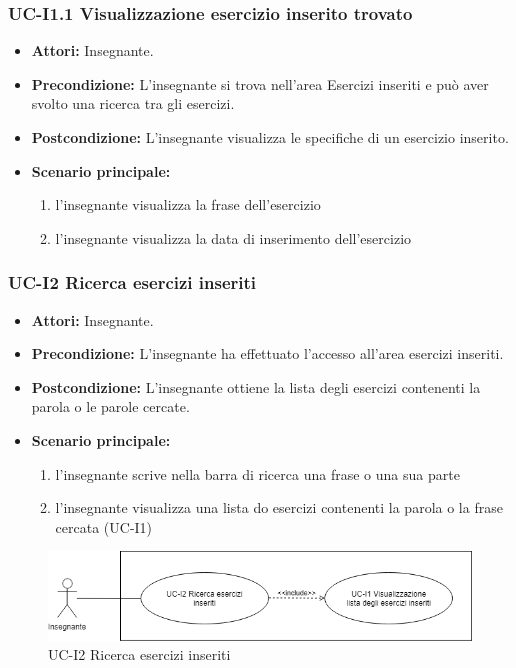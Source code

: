 \subsubsection{UC-I1.1 Visualizzazione esercizio inserito trovato}
\begin{itemize}
\item \textbf{Attori: }Insegnante.
		\item \textbf{Precondizione: }L'insegnante si trova nell'area Esercizi inseriti e può aver svolto una ricerca tra gli esercizi.
		\item \textbf{Postcondizione: }L'insegnante visualizza le specifiche di un esercizio inserito. 
		\item \textbf{Scenario principale:}
		\begin{enumerate}
			\item l'insegnante visualizza la frase dell'esercizio
			\item l'insegnante visualizza la data di inserimento dell'esercizio
		\end{enumerate}
	\end{itemize}

\subsubsection{UC-I2 Ricerca esercizi inseriti}
\begin{itemize}
	\item \textbf{Attori:} Insegnante.
	\item \textbf{Precondizione:} L'insegnante ha effettuato l'accesso all'area esercizi inseriti.
	\item \textbf{Postcondizione:} L'insegnante ottiene la lista degli esercizi contenenti la parola o le parole cercate.
	\item \textbf{Scenario principale:}
		\begin{enumerate}
				\item l'insegnante scrive nella barra di ricerca una frase o una sua parte
				\item l'insegnante visualizza una lista do esercizi contenenti la parola o la frase cercata (UC-I1)
		\end{enumerate}
\end{itemize}
\begin{figure}[h]
		\centering
		\includegraphics[scale=0.7]{images/UC-I2.png}
		\caption{UC-I2 Ricerca esercizi inseriti}
	\end{figure}	

